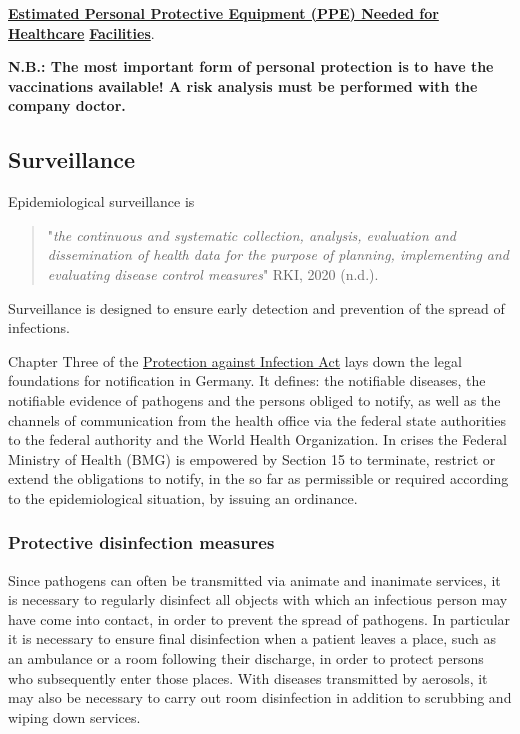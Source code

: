 \documentclass{article}
\begin{document}
\textbf{\href{https://www.cdc.gov/vhf/ebola/healthcare-us/ppe/calculator.html}{Estimated Personal Protective Equipment (PPE) Needed for Healthcare}}\textbf{ }\textbf{\href{https://www.cdc.gov/vhf/ebola/healthcare-us/ppe/calculator.html}{Facilities}}.


\textbf{N.B.: The most important form of personal protection is to have the vaccinations available! A risk analysis must be performed with the company doctor.}


\subsection{Surveillance}\label{H3970817}



Epidemiological surveillance is

\begin{quote}



"\emph{the continuous and systematic collection, analysis, evaluation and dissemination of health data for the purpose of planning, implementing and evaluating disease control measures}" RKI, 2020 (n.d.).


\end{quote}


Surveillance is designed to ensure early detection and prevention of the spread of infections.


Chapter Three of the \href{https://www.rki.de/EN/Content/infections/inf_dis_down.pdf?__blob=publicationFile}{Protection against Infection Act} lays down the legal foundations for notification in Germany. It defines: the notifiable diseases, the notifiable evidence of pathogens and the persons obliged to notify, as well as the channels of communication from the health office via the federal state authorities to the federal authority and the World Health Organization. In crises the Federal Ministry of Health (BMG) is empowered by Section 15 to terminate, restrict or extend the obligations to notify, in the so far as permissible or required according to the epidemiological situation, by issuing an ordinance.


\subsubsection{Protective disinfection measures}\label{H8552555}



Since pathogens can often be transmitted via animate and inanimate services, it is necessary to regularly disinfect all objects with which an infectious person may have come into contact, in order to prevent the spread of pathogens. In particular it is necessary to ensure final disinfection when a patient leaves a place, such as an ambulance or a room following their discharge, in order to protect persons who subsequently enter those places. With diseases transmitted by aerosols, it may also be necessary to carry out room disinfection in addition to scrubbing and wiping down services.
\end{document}
